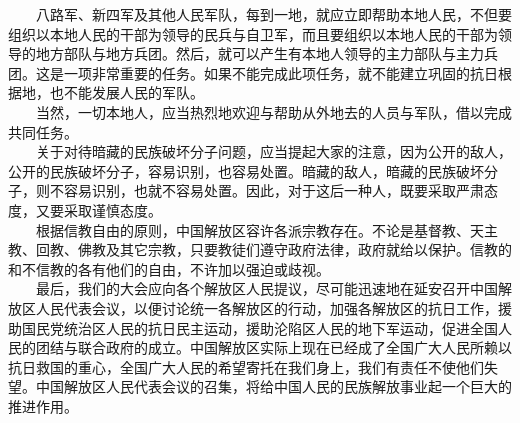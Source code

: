 \documentclass[cn,11pt,chinese]{elegantbook}
\begin{document}
　　八路军、新四军及其他人民军队，每到一地，就应立即帮助本地人民，不但要组织以本地人民的干部为领导的民兵与自卫军，而且要组织以本地人民的干部为领导的地方部队与地方兵团。然后，就可以产生有本地人领导的主力部队与主力兵团。这是一项非常重要的任务。如果不能完成此项任务，就不能建立巩固的抗日根据地，也不能发展人民的军队。\\
　　当然，一切本地人，应当热烈地欢迎与帮助从外地去的人员与军队，借以完成共同任务。\\
　　关于对待暗藏的民族破坏分子问题，应当提起大家的注意，因为公开的敌人，公开的民族破坏分子，容易识别，也容易处置。暗藏的敌人，暗藏的民族破坏分子，则不容易识别，也就不容易处置。因此，对于这后一种人，既要采取严肃态度，又要采取谨慎态度。\\
　　根据信教自由的原则，中国解放区容许各派宗教存在。不论是基督教、天主教、回教、佛教及其它宗教，只要教徒们遵守政府法律，政府就给以保护。信教的和不信教的各有他们的自由，不许加以强迫或歧视。\\
　　最后，我们的大会应向各个解放区人民提议，尽可能迅速地在延安召开中国解放区人民代表会议，以便讨论统一各解放区的行动，加强各解放区的抗日工作，援助国民党统治区人民的抗日民主运动，援助沦陷区人民的地下军运动，促进全国人民的团结与联合政府的成立。中国解放区实际上现在已经成了全国广大人民所赖以抗日救国的重心，全国广大人民的希望寄托在我们身上，我们有责任不使他们失望。中国解放区人民代表会议的召集，将给中国人民的民族解放事业起一个巨大的推进作用。\\
\end{document}
